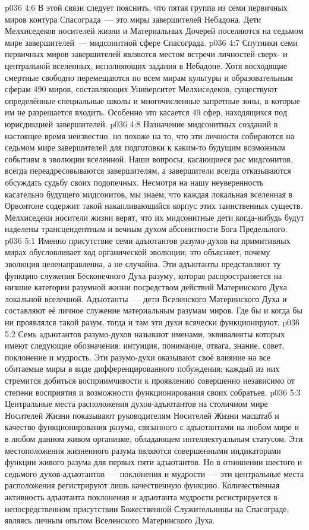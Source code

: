 \vs p036 4:6 В этой связи следует пояснить, что пятая группа из семи первичных миров контура Спасограда~--- это миры завершителей Небадона. Дети Мелхиседеков носителей жизни и Материальных Дочерей поселяются на седьмом мире завершителей~--- мидсонитной сфере Спасограда.
\vs p036 4:7 Спутники семи первичных миров завершителей являются местом встречи личностей сверх- и центральной вселенных, исполняющих задания в Небадоне. Хотя восходящие смертные свободно перемещаются по всем мирам культуры и образовательным сферам 490 миров, составляющих Университет Мелхиседеков, существуют определённые специальные школы и многочисленные запретные зоны, в которые им не разрешается входить. Особенно это касается 49 сфер, находящихся под юрисдикцией завершителей.
\vs p036 4:8 \pc Назначение мидсонитных созданий в настоящее время неизвестно, но похоже на то, что эти личности собираются на седьмом мире завершителей для подготовки к каким\hyp{}то будущим возможным событиям в эволюции вселенной. Наши вопросы, касающиеся рас мидсонитов, всегда переадресовываются завершителям, а завершители всегда отказываются обсуждать судьбу своих подопечных. Несмотря на нашу неуверенность касательно будущего мидсонитов, мы знаем, что каждая локальная вселенная в Орвонтоне содержит такой накапливающийся корпус этих таинственных существ. Мелхиседеки носители жизни верят, что их мидсонитные дети когда\hyp{}нибудь будут наделены трансцендентным и вечным духом абсонитности Бога Предельного.
\vs p036 5:1 Именно присутствие семи адъютантов разумо\hyp{}духов на примитивных мирах обусловливает ход органической эволюции; это объясняет, почему эволюция целенаправленна, а не случайна. Эти адъютанты представляют ту функцию служения Бесконечного Духа разуму, которая распространяется на низшие категории разумной жизни посредством действий Материнского Духа локальной вселенной. Адъютанты~--- дети Вселенского Материнского Духа и составляют её личное служение материальным разумам миров. Где бы и когда бы ни проявлялся такой разум, тогда и там эти духи всячески функционируют.
\vs p036 5:2 Семь адъютантов разумо\hyp{}духов называют именами, эквиваленты которых имеют следующие обозначения: интуиция, понимание, отвага, знание, совет, поклонение и мудрость. Эти разумо\hyp{}духи оказывают своё влияние на все обитаемые миры в виде дифференцированного побуждения; каждый из них стремится добиться восприимчивости к проявлению совершенно независимо от степени восприятия и возможности функционирования своих собратьев.
\vs p036 5:3 Центральные места расположения духов\hyp{}адъютантов на столичном мире Носителей Жизни показывают руководителям Носителей Жизни масштаб и качество функционирования разума, связанного с адъютантами на любом мире и в любом данном живом организме, обладающем интеллектуальным статусом. Эти местоположения жизненного разума являются совершенными индикаторами функции живого разума для первых пяти адъютантов. Но в отношении шестого и седьмого духов\hyp{}адъютантов~--- поклонения и мудрости~--- эти центральные места расположения регистрируют лишь качественную функцию. Количественная активность адъютанта поклонения и адъютанта мудрости регистрируется в непосредственном присутствии Божественной Служительницы на Спасограде, являясь личным опытом Вселенского Материнского Духа.
